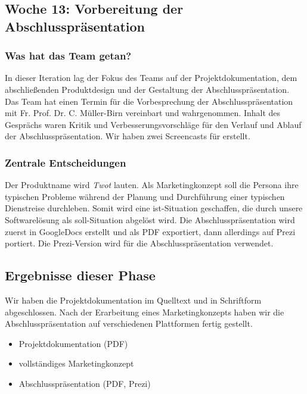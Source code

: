 \documentclass{article}
\begin{document}
\subsection{Woche 13: Vorbereitung der Abschlusspr\"asentation}

\subsubsection{Was hat das Team getan?}

In dieser Iteration lag der Fokus des Teams auf der Projektdokumentation, dem abschlie\ss enden Produktdesign und der Gestaltung der Abschlusspr\"asentation.\\
Das Team hat einen Termin f\"ur die Vorbesprechung der Abschlusspr\"asentation mit Fr. Prof. Dr. C. M\"uller-Birn vereinbart und wahrgenommen. Inhalt des Gespr\"achs waren Kritik und Verbesserungsvorschl\"age für den Verlauf und Ablauf der Abschlusspr\"asentation. Wir haben zwei Screencasts f\"ur erstellt.

\subsubsection{Zentrale Entscheidungen}

Der Produktname wird \textit{Twot} lauten. Als Marketingkonzept soll die Persona ihre typischen Probleme w\"ahrend der Planung und Durchf\"uhrung einer typischen Dienstreise durchleben. Somit wird eine ist-Situation geschaffen, die durch unsere Softwarel\"osung als soll-Situation abgel\"ost wird. Die Abschlusspr\"asentation wird zuerst in GoogleDocs erstellt und als PDF exportiert, dann allerdings auf Prezi portiert. Die Prezi-Version wird f\"ur die Abschlusspr\"asentation verwendet. 

\subsection{Ergebnisse dieser Phase}

Wir haben die Projektdokumentation im Quelltext und in Schriftform abgeschlossen. Nach der Erarbeitung eines Marketingkonzepts haben wir die Abschlusspr\"asentation auf verschiedenen Plattformen fertig gestellt.

\begin{itemize}
\item Projektdokumentation (PDF)
\item vollst\"andiges Marketingkonzept
\item Abschlusspr\"asentation (PDF, Prezi)
\end{itemize}
\end{document}
